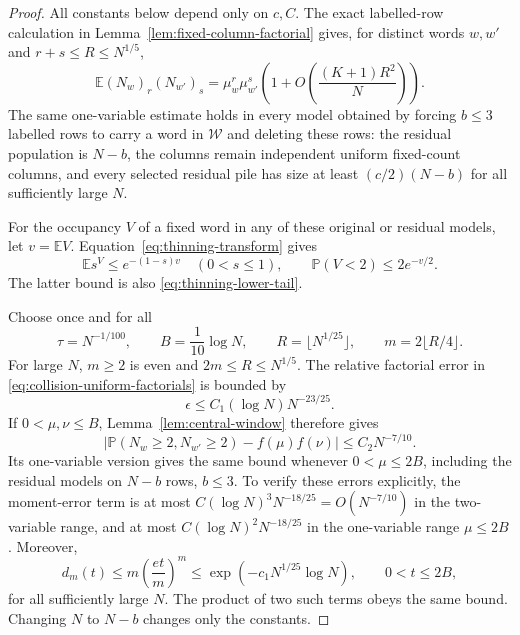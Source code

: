 \documentclass[11pt]{article}
\numberwithin{equation}{section}
\newcommand{\E}{\mathbb E}
\newcommand{\Pp}{\mathbb P}
\newcommand{\1}{\mathbf 1}
\begin{document}
\begin{proof}
All constants below depend only on $c,C$. The exact labelled-row calculation
in Lemma~\ref{lem:fixed-column-factorial} gives, for distinct words $w,w'$
and $r+s\le R\le N^{1/5}$,
\begin{equation}
\label{eq:collision-uniform-factorials}
 \E(N_w)_r(N_{w'})_s
 =\mu_w^r\mu_{w'}^s\left(1+O\left(\frac{(K+1)R^2}{N}\right)\right).
\end{equation}
The same one-variable estimate holds in every model obtained by forcing
$b\le3$ labelled rows to carry a word in $\mathcal W$ and deleting these
rows: the residual population is $N-b$, the columns remain independent
uniform fixed-count columns, and every selected residual pile has size at
least $(c/2)(N-b)$ for all sufficiently large $N$.

For the occupancy $V$ of a fixed word in any of these original or residual
models, let $v=\E V$. Equation~\eqref{eq:thinning-transform} gives
\begin{equation}
\label{eq:collision-empty-singleton-tail}
 \E s^V\le e^{-(1-s)v}\quad(0<s\le1),\qquad
 \Pp(V<2)\le2e^{-v/2}.
\end{equation}
The latter bound is also \eqref{eq:thinning-lower-tail}.

Choose once and for all
\[
 \tau=N^{-1/100},\qquad B=\frac1{10}\log N,
 \qquad R=\lfloor N^{1/25}\rfloor,
 \qquad m=2\lfloor R/4\rfloor.
\]
For large $N$, $m\ge2$ is even and $2m\le R\le N^{1/5}$.
The relative factorial error in \eqref{eq:collision-uniform-factorials}
is bounded by
\[
 \epsilon\le C_1(\log N)N^{-23/25}.
\]
If $0<\mu,\nu\le B$, Lemma~\ref{lem:central-window} therefore gives
\begin{equation}
\label{eq:collision-central-absolute}
 \left|\Pp(N_w\ge2,N_{w'}\ge2)-f(\mu)f(\nu)\right|
 \le C_2N^{-7/10}.
\end{equation}
Its one-variable version gives the same bound whenever $0<\mu\le2B$,
including the residual models on $N-b$ rows, $b\le3$.
To verify these errors explicitly, the moment-error term is at most
$C(\log N)^3N^{-18/25}=O(N^{-7/10})$ in the two-variable range,
and at most $C(\log N)^2N^{-18/25}$ in the one-variable range $\mu\le2B$.
Moreover,
\[
 d_m(t)\le m\left(\frac{et}{m}\right)^m
 \le\exp(-c_1N^{1/25}\log N),\qquad 0<t\le2B,
\]
for all sufficiently large $N$. The product of two such terms obeys the
same bound. Changing $N$ to $N-b$ changes only the constants.


\end{proof}
\end{document}
